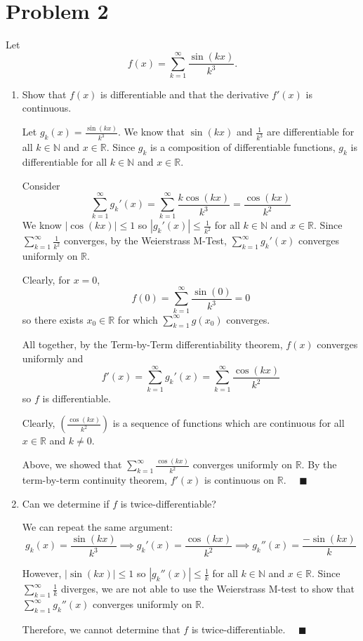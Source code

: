\documentclass[12pt]{article}
\newcommand{\R}{\mathbb{R}}
\newcommand{\N}{\mathbb{N}}
\newcommand{\qed}{\quad \blacksquare}
\newcommand{\abs}[1]{\left\vert #1 \right\vert}
\begin{document}
\section*{Problem 2 }
Let
\begin{equation*}
	f(x)=\sum_{k=1}^{\infty}\frac{\sin(kx)}{k^3}.
\end{equation*}
\begin{enumerate}
	\item Show that $f(x)$ is differentiable and that the derivative $f'(x)$ is continuous.
	
        \color{blue}
            Let $g_k(x) = \frac{\sin(kx)}{k^3}$. We know that $\sin(kx)$ and $\frac{1}{k^3}$ are differentiable for all $k \in \N$ and $x \in \R$. Since $g_k$ is a composition of differentiable functions, $g_k$ is differentiable for all $k \in \N$ and $x \in \R$.

            Consider 
            \[\sum_{k=1}^{\infty} g_k'(x) = \sum_{k=1}^{\infty} \frac{k\cos(kx)}{k^3} = \frac{\cos(kx)}{k^2}\]
            We know $\abs{\cos(kx)} \leq 1$ so $\abs{g_k'(x)} \leq \frac{1}{k^2}$ for all $k \in \N$ and $x \in \R$. Since $\sum_{k=1}^{\infty} \frac{1}{k^2}$ converges, by the Weierstrass M-Test, $\sum_{k=1}^{\infty} g_k'(x)$ converges uniformly on $\R$.
            
            Clearly, for $x= 0$, 
            \[f(0) = \sum_{k=1}^{\infty} \frac{\sin(0)}{k^3} = 0\]
            so there exists $x_0 \in \R$ for which $\sum_{k=1}^{\infty} g(x_0)$ converges. 

            All together, by the Term-by-Term differentiability theorem, $f(x)$ converges uniformly and 
            \[f'(x) = \sum_{k=1}^{\infty} g_k'(x) = \sum_{k=1}^{\infty} \frac{\cos(kx)}{k^2}\] 
            so $f$ is differentiable. 

            Clearly, $\left(\frac{\cos(kx)}{k^2}\right)$ is a sequence of functions which are continuous for all $x \in \R$ and $k \neq 0$. 

            Above, we showed that $\sum_{k=1}^{\infty} \frac{\cos(kx)}{k^2}$ converges uniformly on $\R$. By the term-by-term continuity theorem, $f'(x)$ is continuous on $\R$. $\qed$
        
        \color{black}

	\item Can we determine if $f$ is twice-differentiable?
	
        \color{blue}
            We can repeat the same argument: 
            \[g_k(x) = \frac{\sin(kx)}{k^3} \implies g_k'(x) = \frac{\cos(kx)}{k^2} \implies g_k''(x) = \frac{-\sin(kx)}{k}\]

            However, $\abs{\sin(kx)} \leq 1$ so $\abs{g_k''(x)} \leq \frac{1}{k}$ for all $k \in \N$ and $x \in \R$. Since $\sum_{k=1}^{\infty} \frac{1}{k}$ diverges, we are not able to use the Weierstrass M-test to show that $\sum_{k=1}^{\infty} g_k''(x)$ converges uniformly on $\R$.

            Therefore, we cannot determine that $f$ is twice-differentiable. $\qed$
        \color{black}

\end{enumerate}
\end{document}

